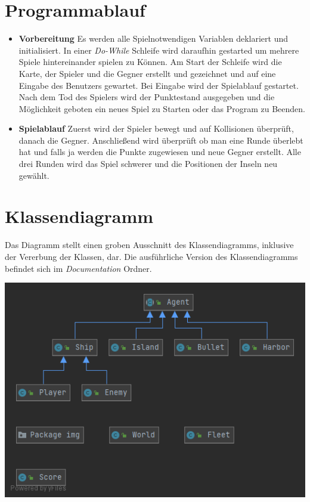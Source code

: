\documentclass{article}
\begin{document}
\section{Programmablauf}
\begin{itemize}
    \item \textbf{Vorbereitung}
        \newline
        Es werden alle Spielnotwendigen Variablen deklariert und initialisiert. In einer \textit{Do-While} Schleife wird daraufhin gestarted um mehrere Spiele hintereinander spielen zu Können. Am Start der Schleife wird die Karte, der Spieler und die Gegner erstellt und gezeichnet und auf eine Eingabe des Benutzers gewartet. Bei Eingabe wird der Spielablauf gestartet. Nach dem Tod des Spielers wird der Punktestand ausgegeben und die Möglichkeit geboten ein neues Spiel zu Starten oder das Program zu Beenden.
    \item \textbf{Spielablauf}
        \newline
        Zuerst wird der Spieler bewegt und auf Kollisionen überprüft, danach die Gegner. Anschließend wird überprüft ob man eine Runde überlebt hat und falls ja werden die Punkte zugewiesen und neue Gegner erstellt. Alle drei Runden wird das Spiel schwerer und die Positionen der Inseln neu gewählt.
\end{itemize}
\newpage

\newpage
\section{Klassendiagramm}
Das Diagramm stellt einen groben Ausschnitt des Klassendiagramms, inklusive der Vererbung der Klassen, dar. Die ausführliche Version des Klassendiagramms befindet sich im \textit{Documentation} Ordner.
\newline

\includegraphics[width=\textwidth,height=\textheight,keepaspectratio]{./images/Rough_UML.png}
\newpage
\end{document}

